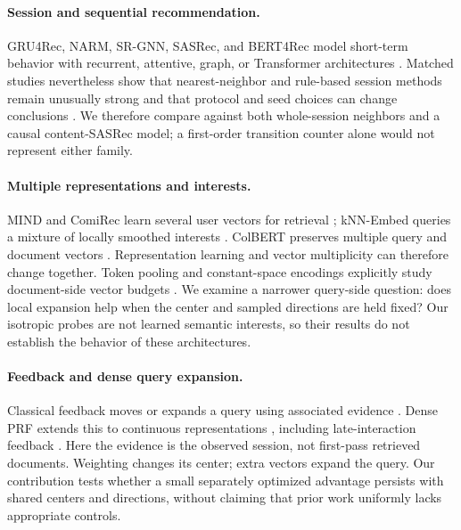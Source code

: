 \documentclass[runningheads]{llncs}
\begin{document}
\paragraph{Session and sequential recommendation.}
GRU4Rec, NARM, SR-GNN, SASRec, and BERT4Rec model short-term behavior with
recurrent, attentive, graph, or Transformer architectures
\cite{hidasi2016session,li2017narm,wu2019srgnn,kang2018sasrec,sun2019bert4rec}.
Matched studies nevertheless show that nearest-neighbor and rule-based session
methods remain unusually strong and that protocol and seed choices can change
conclusions \cite{ludewig2018evaluation,shehzad2024comparison}. We therefore
compare against both whole-session neighbors and a causal content-SASRec model;
a first-order transition counter alone would not represent either family.

\paragraph{Multiple representations and interests.}
MIND and ComiRec learn several user vectors for retrieval
\cite{li2019mind,cen2020comirec}; kNN-Embed queries a mixture of locally smoothed
interests \cite{elkishky2022knnembed}. ColBERT preserves multiple query and
document vectors \cite{khattab2020colbert}. Representation learning and vector
multiplicity can therefore change together. Token pooling and constant-space
encodings explicitly study document-side vector budgets
\cite{clavie2024pooling,macavaney2025constant}. We examine a narrower query-side
question: does local expansion help when the center and sampled directions
are held fixed? Our isotropic probes are not learned semantic interests, so
their results do not establish the behavior of these architectures.

\paragraph{Feedback and dense query expansion.}
Classical feedback moves or expands a query using associated evidence
\cite{rocchio1971feedback,lavrenko2001relevance}. Dense PRF extends this to
continuous representations \cite{yu2021denseprf,li2022denseprf}, including
late-interaction feedback \cite{wang2021multirepprf}. Here the evidence is the
observed session, not first-pass retrieved documents. Weighting changes its
center; extra vectors expand the query. Our contribution tests whether a small
separately optimized advantage persists with shared centers and directions,
without claiming that prior work uniformly lacks appropriate controls.
\end{document}
